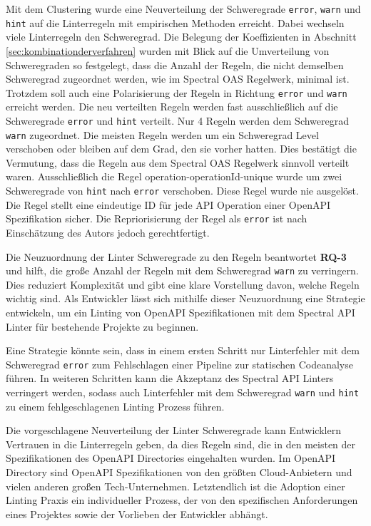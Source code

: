 Mit dem Clustering wurde eine Neuverteilung der Schweregrade \texttt{error}, \texttt{warn} und \texttt{hint} auf die Linterregeln mit empirischen Methoden erreicht. Dabei wechseln viele Linterregeln den Schweregrad. Die Belegung der Koeffizienten in Abschnitt \ref{sec:kombinationderverfahren} wurden mit Blick auf die Umverteilung von Schweregraden so festgelegt, dass die Anzahl der Regeln, die nicht demselben Schweregrad zugeordnet werden, wie im Spectral \acs{OAS} Regelwerk, minimal ist. Trotzdem soll auch eine Polarisierung der Regeln in Richtung \texttt{error} und \texttt{warn} erreicht werden. Die neu verteilten Regeln werden fast ausschließlich auf die Schweregrade \texttt{error} und \texttt{hint} verteilt. Nur 4 Regeln werden dem Schweregrad \texttt{warn} zugeordnet. Die meisten Regeln werden um ein Schweregrad Level verschoben oder bleiben auf dem Grad, den sie vorher hatten. Dies bestätigt die Vermutung, dass die Regeln aus dem Spectral \acs{OAS} Regelwerk sinnvoll verteilt waren. Ausschließlich die Regel operation-operationId-unique wurde um zwei Schweregrade von \texttt{hint} nach \texttt{error} verschoben. Diese Regel wurde nie ausgelöst. Die Regel stellt eine eindeutige ID für jede API Operation einer OpenAPI Spezifikation sicher. Die Repriorisierung der Regel als \texttt{error} ist nach Einschätzung des Autors jedoch gerechtfertigt.

Die Neuzuordnung der Linter Schweregrade zu den Regeln beantwortet \textbf{RQ-3} und hilft, die große Anzahl der Regeln mit dem Schweregrad \texttt{warn} zu verringern. Dies reduziert Komplexität und gibt eine klare Vorstellung davon, welche Regeln wichtig sind. Als Entwickler lässt sich mithilfe dieser Neuzuordnung eine Strategie entwickeln, um ein Linting von OpenAPI Spezifikationen mit dem Spectral API Linter für bestehende Projekte zu beginnen. 

Eine Strategie könnte sein, dass in einem ersten Schritt nur Linterfehler mit dem Schweregrad \texttt{error} zum Fehlschlagen einer Pipeline zur statischen Codeanalyse führen. In weiteren Schritten kann die Akzeptanz des Spectral \acs{API} Linters verringert werden, sodass auch Linterfehler mit dem Schweregrad \texttt{warn} und \texttt {hint} zu einem fehlgeschlagenen Linting Prozess führen. 

Die vorgeschlagene Neuverteilung der Linter Schweregrade kann Entwicklern Vertrauen in die Linterregeln geben, da dies Regeln sind, die in den meisten der Spezifikationen des OpenAPI Directories eingehalten wurden. Im OpenAPI Directory sind OpenAPI Spezifikationen von den größten Cloud-Anbietern und vielen anderen großen Tech-Unternehmen. Letztendlich ist die Adoption einer Linting Praxis ein individueller Prozess, der von den spezifischen Anforderungen eines Projektes sowie der Vorlieben der Entwickler abhängt.

